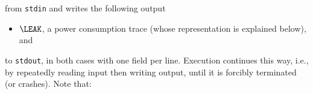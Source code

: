 \documentclass[crop={false},multi={true},tikz={true}]{standalone}
\begin{document}
\noindent
from \lstinline[language={bash}]{stdin} and writes the following output

\begin{itemize}
      \item $\LEAK$,
            a power consumption trace
            (whose representation is explained below),
            and
%
\end{itemize}

\noindent
to \lstinline[language={bash}]{stdout}, in both cases with one field per 
line.  Execution continues this way, i.e., by repeatedly reading input 
then writing output, until it is forcibly terminated (or crashes).  
Note that:
\end{document}
